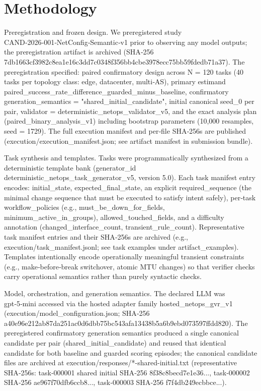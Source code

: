 \documentclass[conference]{IEEEtran}
\begin{document}
\section{Methodology}
Preregistration and frozen design. We preregistered study CAND‑2026‑001‑NetConfig‑Semantic‑v1 prior to observing any model outputs; the preregistration artifact is archived (SHA‑256 7db1663cf3982c8ea1e16c3dd7c0348f356bb4cbe3978ecc75bb59fdedb71a37). The preregistration specified: paired confirmatory design across N = 120 tasks (40 tasks per topology class: edge, datacenter, multi‑AS), primary estimand paired\_success\_rate\_difference\_guarded\_minus\_baseline, confirmatory generation\_semantics = "shared\_initial\_candidate", initial canonical seed\_0 per pair, validator = deterministic\_netops\_validator\_v5, and the exact analysis plan (paired\_binary\_analysis\_v1) including bootstrap parameters (10,000 resamples, seed = 1729). The full execution manifest and per‑file SHA‑256s are published (execution/execution\_manifest.json; see artifact manifest in submission bundle).

Task synthesis and templates. Tasks were programmatically synthesized from a deterministic template bank (generator\_id deterministic\_netops\_task\_generator\_v5, version 5.0). Each task manifest entry encodes: initial\_state, expected\_final\_state, an explicit required\_sequence (the minimal change sequence that must be executed to satisfy intent safely), per‑task workflow\_policies (e.g., must\_be\_down\_for\_fields, minimum\_active\_in\_groups), allowed\_touched\_fields, and a difficulty annotation (changed\_interface\_count, transient\_rule\_count). Representative task manifest entries and their SHA‑256s are archived (e.g., execution/task\_manifest.jsonl; see task examples under artifact\_examples). Templates intentionally encode operationally meaningful transient constraints (e.g., make‑before‑break switchover, atomic MTU changes) so that verifier checks carry operational semantics rather than purely syntactic checks.

Model, orchestration, and generation semantics. The declared LLM was gpt‑5‑mini accessed via the hosted adapter family hosted\_netops\_gvr\_v1 (execution/model\_configuration.json; SHA‑256 a40e96e212ab87da251ac0d6dbb75bc543afa13438b5a6b9ebd073597ffdd820). The preregistered confirmatory generation semantics produced a single canonical candidate per pair (shared\_initial\_candidate) and reused that identical candidate for both baseline and guarded scoring episodes; the canonical candidate files are archived at execution/responses/*-shared-initial.txt (representative SHA‑256s: task‑000001 shared initial SHA‑256 8f38c8becd7e1e36..., task‑000002 SHA‑256 ae967f70dfb6ccb8..., task‑000003 SHA‑256 f7f4db249ecbbce...).
\end{document}
